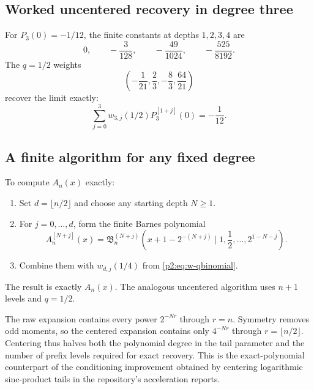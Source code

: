 \documentclass[11pt,oneside]{article}
\numberwithin{equation}{section}
\theoremstyle{definition}
\theoremstyle{remark}
\begin{document}
\subsection{Worked uncentered recovery in degree three}

For $P_3(0)=-1/12$, the finite constants at depths $1,2,3,4$ are
\begin{equation}
 0,
 \qquad -\frac3{128},
 \qquad -\frac{49}{1024},
 \qquad -\frac{525}{8192}.
 \label{p2:eq:P3-prefix-values}
\end{equation}
The $q=1/2$ weights
\begin{equation}
 \left(-\frac1{21},\frac23,-\frac83,\frac{64}{21}\right)
 \label{p2:eq:q12-weights3}
\end{equation}
recover the limit exactly:
\begin{equation}
 \sum_{j=0}^{3}w_{3,j}(1/2)P_3^{[1+j]}(0)=-\frac1{12}.
 \label{p2:eq:P3-exact-example}
\end{equation}

\subsection{A finite algorithm for any fixed degree}

\begin{algorithm}
\label{p2:alg:exact-Appell}
To compute $A_n(x)$ exactly:
\begin{enumerate}
\item Set $d=\lfloor n/2\rfloor$ and choose any starting depth $N\ge1$.
\item For $j=0,\ldots,d$, form the finite Barnes polynomial
\[
 A_n^{[N+j]}(x)
 =\mathfrak B_n^{(N+j)}
 \left(x+1-2^{-(N+j)}\mid1,\frac12,\ldots,2^{1-N-j}\right).
\]
\item Combine them with $w_{d,j}(1/4)$ from \eqref{p2:eq:w-qbinomial}.
\end{enumerate}
The result is exactly $A_n(x)$.  The analogous uncentered algorithm uses $n+1$ levels and
$q=1/2$.
\end{algorithm}

\begin{remark}
The raw expansion contains every power $2^{-Nr}$ through $r=n$.  Symmetry removes odd moments,
so the centered expansion contains only $4^{-Nr}$ through $r=\lfloor n/2\rfloor$.  Centering thus
halves both the polynomial degree in the tail parameter and the number of prefix levels required for
exact recovery.  This is the exact-polynomial counterpart of the conditioning improvement obtained
by centering logarithmic sinc-product tails in the repository's acceleration reports.
\end{remark}
\end{document}

